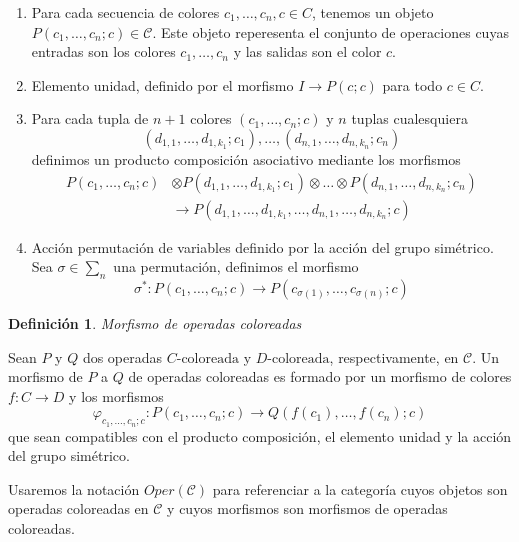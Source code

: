 \documentclass[11pt,a4paper,openright,oneside]{article}
\numberwithin{equation}{section}
\newtheorem{defi}[teo]{Definici\'on}
\theoremstyle{definition}
\begin{document}
\begin{enumerate}[(1)]
    \item Para cada secuencia de colores $c_1,\dots,c_n,c\in C$, tenemos un objeto $P(c_1,\dots,c_n;c)\in\mathcal{C}$.
          Este objeto reperesenta el conjunto de operaciones cuyas entradas son los colores $c_1,\dots,c_n$ y las salidas son el color $c$.
    \item Elemento unidad, definido por el morfismo $I \longrightarrow P(c;c)$ para todo $c\in C$.
    \item Para cada tupla de $n+1$ colores $(c_1,\dots,c_n;c)$ y $n$ tuplas cualesquiera
          $$
              (d_{1,1},\dots,d_{1,k_1};c_1),\dots,(d_{n,1},\dots,d_{n,k_n};c_n)
          $$
          definimos un producto composici\'on asociativo mediante los morfismos
          \begin{align*}
              P(c_1,\dots,c_n;c) & \otimes P(d_{1,1},\dots,d_{1,k_1};c_1) \otimes\dots\otimes P(d_{n,1},\dots,d_{n,k_n};c_n) \\
                                 & \longrightarrow P(d_{1,1},\dots,d_{1,k_1},\dots,d_{n,1},\dots,d_{n,k_n};c)
          \end{align*}
    \item Acci\'on permutaci\'on de variables definido por la acci\'on del grupo sim\'etrico. Sea $\sigma\in\sum_n$ una permutaci\'on, definimos el morfismo
          $$
              \sigma^{*}: P(c_1,\dots,c_n;c) \longrightarrow P(c_{\sigma(1)},\dots,c_{\sigma(n)};c)
          $$
\end{enumerate}

\begin{defi}
    Morfismo de operadas coloreadas
\end{defi}
Sean $P$ y $Q$ dos operadas $C\text{-coloreada}$ y $D\text{-coloreada}$, respectivamente, en $\mathcal{C}$. Un morfismo de $P$ a $Q$ de operadas coloreadas es formado
por un morfismo de colores $f: C \longrightarrow D$ y los morfismos
$$
    \varphi_{c_1,\dots,c_n;c}: P(c_1,\dots,c_n;c) \longrightarrow Q(f(c_1),\dots,f(c_n);c)
$$
que sean compatibles con el producto composici\'on, el elemento unidad y la acci\'on del grupo sim\'etrico.

Usaremos la notaci\'on $Oper(\mathcal{C})$ para referenciar a la categor\'ia cuyos objetos son operadas coloreadas en $\mathcal{C}$ y cuyos morfismos son morfismos de operadas coloreadas.

\newpage

\end{document}
